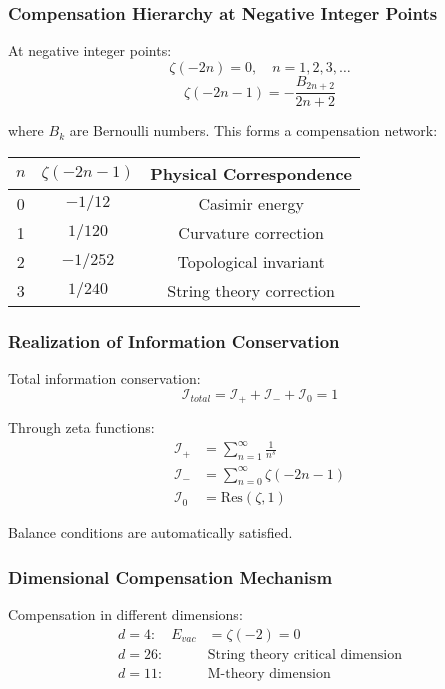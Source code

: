 \documentclass[11pt]{article}
\theoremstyle{plain}
\theoremstyle{definition}
\theoremstyle{remark}
\begin{document}
\subsubsection{Compensation Hierarchy at Negative Integer Points}

At negative integer points:
$$\zeta(-2n) = 0, \quad n = 1, 2, 3, \ldots$$
$$\zeta(-2n-1) = -\frac{B_{2n+2}}{2n+2}$$

where $B_k$ are Bernoulli numbers. This forms a compensation network:

\begin{center}
\begin{tabular}{|c|c|c|}
\hline
$n$ & $\zeta(-2n-1)$ & Physical Correspondence \\
\hline
0 & $-1/12$ & Casimir energy \\
1 & $1/120$ & Curvature correction \\
2 & $-1/252$ & Topological invariant \\
3 & $1/240$ & String theory correction \\
\hline
\end{tabular}
\end{center}

\subsubsection{Realization of Information Conservation}

Total information conservation:
$$\mathcal{I}_{total} = \mathcal{I}_+ + \mathcal{I}_- + \mathcal{I}_0 = 1$$

Through zeta functions:
\begin{align}
\mathcal{I}_+ &= \sum_{n=1}^{\infty} \frac{1}{n^s} \\
\mathcal{I}_- &= \sum_{n=0}^{\infty} \zeta(-2n-1) \\
\mathcal{I}_0 &= \text{Res}(\zeta, 1)
\end{align}

Balance conditions are automatically satisfied.

\subsubsection{Dimensional Compensation Mechanism}

Compensation in different dimensions:
\begin{align}
d = 4: \quad E_{vac} &= \zeta(-2) = 0 \\
d = 26: \quad &\text{String theory critical dimension} \\
d = 11: \quad &\text{M-theory dimension}
\end{align}
\end{document}

